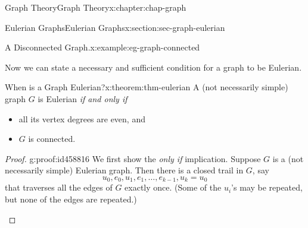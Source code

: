\documentclass[oneside,10pt,]{book}
\numberwithin{equation}{section}
\begin{document}
\begin{chapterptx}{Graph Theory}{}{Graph Theory}{}{}{x:chapter:chap-graph}
\begin{sectionptx}{Eulerian Graphs}{}{Eulerian Graphs}{}{}{x:section:sec-graph-eulerian}
\begin{example}{A Disconnected Graph.}{x:example:eg-graph-connected}
\begin{sidebyside}{1}{0.415}{0.415}{0}
\begin{sbspanel}{0.17}
{
}%
\end{sbspanel}%
\end{sidebyside}%
\end{example}
Now we can state a necessary and sufficient condition for a graph to be Eulerian.%
\begin{theorem}{When is a Graph Eulerian?}{}{x:theorem:thm-eulerian}%
A (not necessarily simple) graph \(G\) is Eulerian \emph{if and only if}%
\begin{itemize}[label=\textbullet]
\item{}all its vertex degrees are even, and%
\item{}\(G\) is connected.%
\end{itemize}
%
\end{theorem}
\begin{proof}{}{g:proof:id458816}
We first show the \emph{only if} implication. Suppose \(G\) is a (not necessarily simple) Eulerian graph. Then there is a closed trail in \(G\), say%
\begin{equation*}
u_0, e_0, u_1, e_1, \ldots, e_{k-1}, u_k = u_0
\end{equation*}
that traverses all the edges of \(G\) exactly once. (Some of the \(u_i\)'s may be repeated, but none of the edges are repeated.)%
\begin{sidebyside}{1}{0.275}{0.275}{0}%
\begin{sbspanel}{0.45}%
\resizebox{\linewidth}{!}{%
			\begin{tikzpicture}[scale=0.7]

\end{tikzpicture}}
\end{sbspanel}
\end{sidebyside}
\end{proof}
\end{sectionptx}
\end{chapterptx}
\end{document}
